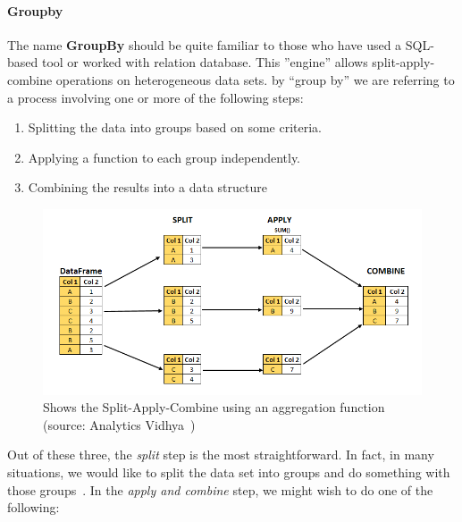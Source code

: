 \paragraph{Groupby}\label{par:groupby}
The name \textbf{GroupBy} should be quite familiar to those who have used a SQL-based tool or worked with relation database. This ''engine'' allows split-apply-combine operations on heterogeneous data sets.
by “group by” we are referring to a process involving one or more of the following steps:
\begin{enumerate}
    \item Splitting the data into groups based on some criteria.
    \item Applying a function to each group independently.
    \item Combining the results into a data structure
\end{enumerate}
\begin{figure}[ht]
    \centering
    \includegraphics[width=\linewidth]{content/chapter_3/images/split-apply-combine.png}
    \caption{Shows the Split-Apply-Combine using an aggregation function (source: Analytics Vidhya~\cite{Misc:pandey_split-apply-combine})}\label{fig:pandas_groupby}
\end{figure}
Out of these three, the \textit{split} step is the most straightforward. In fact, in many situations, we would like to split the data set into groups and do something with those groups~\cite{reback_pandas-dev/pandas:_2022}.
In the \textit{apply and combine} step, we might wish to do one of the following:
